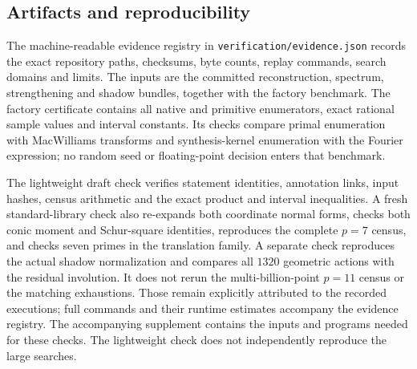 \subsection{Artifacts and reproducibility}
The machine-readable evidence registry in \texttt{verification/evidence.json}
records the exact repository paths, checksums, byte counts, replay commands,
search domains and limits. The inputs are the committed reconstruction,
spectrum, strengthening and shadow bundles, together with the factory benchmark. The factory certificate contains all native and
primitive enumerators, exact rational sample values and interval constants.
Its checks compare primal enumeration with MacWilliams transforms and
synthesis-kernel enumeration with the Fourier expression; no random seed or
floating-point decision enters that benchmark.

The lightweight draft check verifies statement identities, annotation links,
input hashes, census arithmetic and the exact product and interval inequalities.
A fresh standard-library check also re-expands both coordinate normal forms,
checks both conic moment and Schur-square identities, reproduces the complete
$p=7$ census, and checks seven primes in the translation family.
A separate check reproduces the actual shadow normalization and compares all
$1320$ geometric actions with the residual involution.
It does not rerun the multi-billion-point $p=11$ census or the matching
exhaustions. Those remain explicitly attributed to the recorded executions;
full commands and their runtime estimates accompany the evidence registry.
The accompanying supplement contains the inputs and programs needed for these
checks. The lightweight check does not independently reproduce the large searches.

